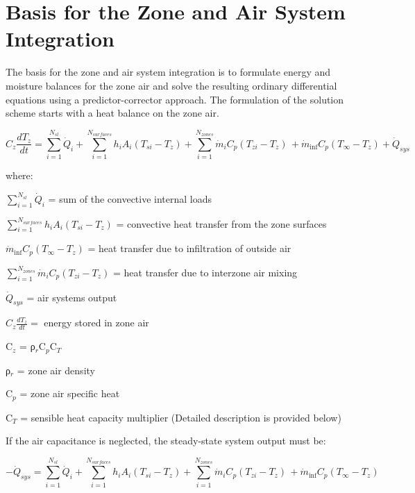 \section{Basis for the Zone and Air System Integration}\label{basis-for-the-zone-and-air-system-integration}

The basis for the zone and air system integration is to formulate energy and moisture balances for the zone air and solve the resulting ordinary differential equations using a predictor-corrector approach. The formulation of the solution scheme starts with a heat balance on the zone air.

\begin{equation}
{C_z}\frac{{d{T_z}}}{{dt}} = \sum\limits_{i = 1}^{{N_{sl}}} {{{\dot Q}_i}}  + \sum\limits_{i = 1}^{{N_{surfaces}}} {{h_i}} {A_i}\left( {{T_{si}} - {T_z}} \right) + \sum\limits_{i = 1}^{{N_{zones}}} {{{\dot m}_i}} {C_p}\left( {{T_{zi}} - {T_z}} \right)\, + {\dot m_{\inf }}{C_p}\left( {{T_\infty } - {T_z}} \right) + {\dot Q_{sys}}
\end{equation}

where:

\(\sum\limits_{i = 1}^{{N_{sl}}} {{{\dot Q}_i}}\) = sum of the convective internal loads

\(\sum\limits_{i = 1}^{{N_{surfaces}}} {{h_i}} {A_i}\left( {{T_{si}} - {T_z}} \right)\) = convective heat transfer from the zone surfaces

\({\dot m_{\inf }}{C_p}\left( {{T_\infty } - {T_z}} \right)\) = heat transfer due to infiltration of outside air

\(\sum_{i = 1}^{N_{zones}} \dot m_i C_p\left( T_{zi} - {T_z} \right)\) = heat transfer due to interzone air mixing

\({\dot Q_{sys}}\) = air systems output

${C_z}\frac{dT_z}{dt} =$ energy stored in zone air

C\(_{z}\) = ρ\(_{r}\)C\(_{p}\)C\(_{T}\)

ρ\(_{r}\) = zone air density

C\(_{p}\) = zone air specific heat

C\(_{T}\) = sensible heat capacity multiplier (Detailed description is provided below)

If the air capacitance is neglected, the steady-state system output must be:

\begin{equation}
- {\dot Q_{sys}} = \sum\limits_{i = 1}^{{N_{sl}}} {{{\dot Q}_i}}  + \sum\limits_{i = 1}^{{N_{surfaces}}} {{h_i}} {A_i}\left( {{T_{si}} - {T_z}} \right) + \sum\limits_{i = 1}^{{N_{zones}}} {{{\dot m}_i}} {C_p}\left( {{T_{zi}} - {T_z}} \right)\, + {\dot m_{\inf }}{C_p}\left( {{T_\infty } - {T_z}} \right)
\end{equation}

